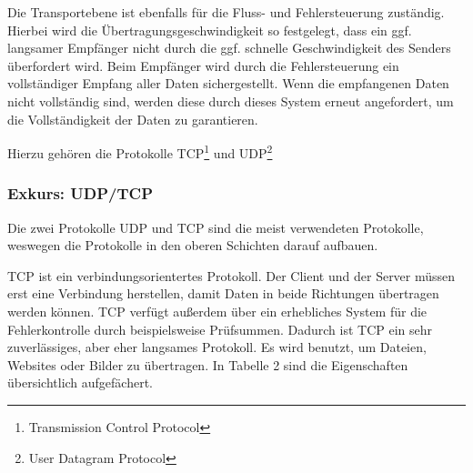 \documentclass[12pt]{article}
\begin{document}
	Die Transportebene ist ebenfalls für die Fluss- und Fehlersteuerung zuständig. Hierbei wird die Übertragungsgeschwindigkeit so festgelegt, dass ein ggf. langsamer Empfänger nicht durch die ggf. schnelle Geschwindigkeit des Senders überfordert wird. Beim Empfänger wird durch die Fehlersteuerung ein vollständiger Empfang aller Daten sichergestellt. Wenn die empfangenen Daten nicht vollständig sind, werden diese durch dieses System erneut angefordert, um die Vollständigkeit der Daten zu garantieren. 
	
	Hierzu gehören die Protokolle TCP\footnote{Transmission Control Protocol} und UDP\footnote{User Datagram Protocol}

\subsubsection{Exkurs: UDP/TCP}

Die zwei Protokolle UDP und TCP sind die meist verwendeten Protokolle, weswegen die Protokolle in den oberen Schichten darauf aufbauen. 

TCP ist ein verbindungsorientertes Protokoll. Der Client und der Server müssen erst eine Verbindung herstellen, damit Daten in beide Richtungen übertragen werden können. TCP verfügt außerdem über ein erhebliches System für die Fehlerkontrolle durch beispielsweise Prüfsummen.\cite{tcp+ip-netzwerkecom} Dadurch ist TCP ein sehr zuverlässiges, aber eher langsames Protokoll. Es wird benutzt, um Dateien, Websites oder Bilder zu übertragen.\cite{tcp} In Tabelle 2 sind die Eigenschaften übersichtlich aufgefächert.

\begin{table}[h]
	\caption{TCP \cite{udp+tcp}}
	\label{fig:figure11}
\end{table}
\end{document}
